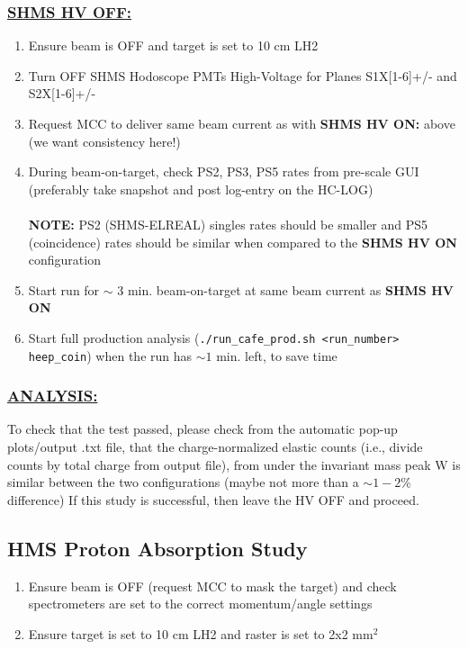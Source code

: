 \documentclass{article}
\begin{document}
\subsubsection*{\underline{SHMS HV OFF:}}
 \begin{enumerate}
    \item Ensure beam is OFF and target is set to 10 cm LH2
    \item Turn OFF SHMS Hodoscope PMTs High-Voltage for Planes S1X[1-6]+/- and S2X[1-6]+/- 
    \item Request MCC to deliver same beam current as with \textbf{SHMS HV ON:} above (we want consistency here!)
    \item During beam-on-target, check PS2, PS3, PS5 rates from pre-scale GUI (preferably take snapshot and post log-entry on the HC-LOG) \\\\ \textbf{NOTE:} PS2 (SHMS-ELREAL) singles rates should be smaller and PS5 (coincidence) rates should be similar when compared to the \textbf{SHMS HV ON} configuration 
    \item Start run for $\sim$ 3  min. beam-on-target at same beam current as \textbf{SHMS HV ON}
    \item Start full production analysis (\texttt{./run\_cafe\_prod.sh <run\_number> heep\_coin}) when the run has $\sim 1$ min. left, to save time
    \end{enumerate}
\subsubsection*{\underline{ANALYSIS:}}
 \begin{enumerate}
 To check that the test passed, please check from the automatic pop-up plots/output .txt file, that the charge-normalized elastic counts (i.e., divide counts by total charge from output file), from under the invariant mass peak W is similar between the two configurations (maybe not more than a $\sim 1-2\%$ difference)
 If this study is successful, then leave the HV OFF and proceed.
 \end{enumerate}
\subsection{HMS Proton Absorption Study}
\begin{enumerate}
    \item Ensure beam is OFF (request MCC to mask the target) and check spectrometers are
    set to the correct momentum/angle settings
    \item Ensure target is set to 10 cm LH2 and raster is set to 2x2 mm$^{2}$
\end{enumerate}
\end{document}
